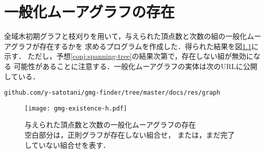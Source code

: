 
\chapter{一般化ムーアグラフの存在}
\label{chap:list-of-gmg}
全域木初期グラフと枝刈りを用いて，与えられた頂点数と次数の組の一般化ムーアグラフが存在するかを
求めるプログラムを作成した．得られた結果を図\ref{fig:gmg-existence}に示す．
ただし，予想\ref{conj:spanning-tree}の結果次第で，存在しない組が無効になる
可能性があることに注意する．一般化ムーアグラフの実体は次のURLに公開している．
\begin{verbatim}
github.com/y-satotani/gmg-finder/tree/master/docs/res/graph
\end{verbatim}

\begin{figure}[htbp]
  \centering
  \captionsetup{justification=centering}
  \texttt{[image: gmg-existence-h.pdf]}
  \caption{与えられた頂点数と次数の一般化ムーアグラフの存在\\
    空白部分は，正則グラフが存在しない組合せ，
    または，まだ完了していない組合せを表す．}
  \label{fig:gmg-existence}
\end{figure}
